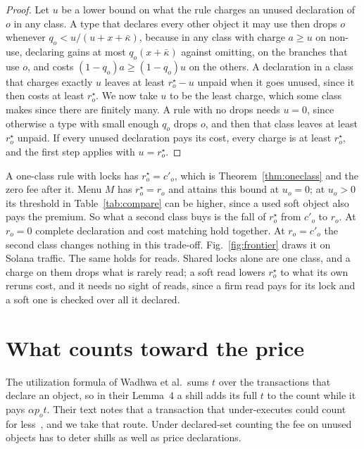 \documentclass[conference,compsoc]{IEEEtran}
\numberwithin{equation}{section}
\theoremstyle{plain}
\theoremstyle{definition}
\theoremstyle{remark}
\newcommand{\cp}{c'}
\begin{document}
\begin{proof}
Let $u$ be a lower bound on what the rule charges an unused declaration of $o$ in any class. A type that declares every other object it may use then drops $o$ whenever $q_o < u/(u + x + \bar\kappa)$, because in any class with charge $a \ge u$ on non-use, declaring gains at most $q_o(x + \bar\kappa)$ against omitting, on the branches that use $o$, and costs $(1-q_o) a \ge (1-q_o) u$ on the others. A declaration in a class that charges exactly $u$ leaves at least $r^\star_o - u$ unpaid when it goes unused, since it then costs at least $r^\star_o$. We now take $u$ to be the least charge, which some class makes since there are finitely many. A rule with no drops needs $u = 0$, since otherwise a type with small enough $q_o$ drops $o$, and then that class leaves at least $r^\star_o$ unpaid. If every unused declaration pays its cost, every charge is at least $r^\star_o$, and the first step applies with $u = r^\star_o$.
\end{proof}

A one-class rule with locks has $r^\star_o = \cp_o$, which is Theorem~\ref{thm:oneclass} and the zero fee after it. Menu $M$ has $r^\star_o = r_o$ and attains this bound at $u_o = 0$; at $u_o > 0$ its threshold in Table~\ref{tab:compare} can be higher, since a used soft object also pays the premium. So what a second class buys is the fall of $r^\star_o$ from $\cp_o$ to $r_o$. At $r_o = 0$ complete declaration and cost matching hold together. At $r_o = \cp_o$ the second class changes nothing in this trade-off. Fig.~\ref{fig:frontier} draws it on Solana traffic. The same holds for reads. Shared locks alone are one class, and a charge on them drops what is rarely read; a soft read lowers $r^\star_o$ to what its own reruns cost, and it needs no sight of reads, since a firm read pays for its lock and a soft one is checked over all it declared.

\section{What counts toward the price}\label{sec:count}

The utilization formula of Wadhwa et al.\ sums $t$ over the transactions that declare an object, so in their Lemma~4 a shill adds its full $t$ to the count while it pays $\alpha p_o t$. Their text notes that a transaction that under-executes could count for less~\cite[p.~1099]{wadhwa2026perils}, and we take that route. Under declared-set counting the fee on unused objects has to deter shills as well as price declarations.
\end{document}
